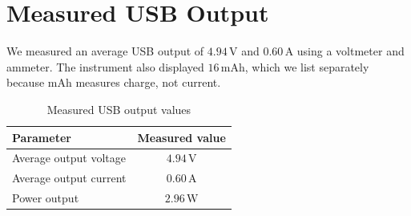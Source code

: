 \documentclass[journal,12pt,twocolumn]{IEEEtran}
\theoremstyle{definition}
\theoremstyle{remark}
\numberwithin{equation}{section}
\begin{document}
\FloatBarrier
{}
\section{Measured USB Output}
We measured an average USB output of $4.94\,\mathrm{V}$ and
$0.60\,\mathrm{A}$ using a voltmeter and ammeter. The instrument
also displayed $16\,\mathrm{mAh}$, which we list separately because
mAh measures charge, not current.

\begin{table}[H]
\centering
\caption{Measured USB output values}
\label{tab:measured-usb-output}
\small
\begin{tabular}{|p{}|c|}
\hline
\textbf{Parameter} & \textbf{Measured value}\\ \hline
Average output voltage & $4.94\,\mathrm{V}$\\
Average output current & $0.60\,\mathrm{A}$\\
Power output & $2.96\,\mathrm{W}$\\
\hline
\end{tabular}
\end{table}
\end{document}
